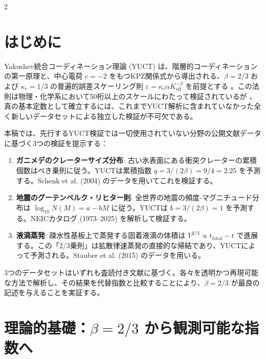 \documentclass[11pt,a4paper]{article}
\newcommand{\eps}{\varepsilon}
\newcommand{\kappac}{\kappa_c}
\newcommand{\Keff}{K_{\mathrm{eff}}}
\newcommand{\betaf}{\beta}
\begin{document}
	\vspace{0.4cm}
	\vspace*{-\baselineskip}
	\begin{multicols}{2}
		
		\section{はじめに}
		
		Yakushev統合コーディネーション理論 (YUCT) は、階層的コーディネーションの第一原理と、中心電荷 \(c = -2\) をもつKPZ関係式から導出される、\(\betaf = 2/3\) および \(\kappac = 1/3\) の普遍的誤差スケーリング則 \(\eps = \kappac \alpha \Keff^{-\betaf}\) を前提とする \cite{AppendixY, AppendixL}。この法則は物理・化学系において50桁以上のスケールにわたって検証されているが \cite{AppendixC, AppendixG}、真の基本定数として確立するには、これまでYUCT解析に含まれていなかった全く新しいデータセットによる独立した検証が不可欠である。
		
		本稿では、先行するYUCT検証では一切使用されていない分野の公開文献データに基づく3つの検証を提示する：
		
		\begin{enumerate}
			\item \textbf{ガニメデのクレーターサイズ分布}: 古い氷表面にある衝突クレーターの累積個数はべき乗則に従う。YUCTは累積指数 \(q = 3/(2\betaf) = 9/4 = 2.25\) を予測する。Schenk et al. (2004) \cite{Schenk2004} のデータを用いてこれを検証する。
			\item \textbf{地震のグーテンベルク・リヒター則}: 全世界の地震の頻度‐マグニチュード分布は \(\log_{10} N(M) = a - bM\) に従う。YUCTは \(b = 3/(2\betaf) = 1\) を予測する。NEICカタログ (1973–2025) \cite{USGSNEIC} を解析して検証する。
			\item \textbf{液滴蒸発}: 疎水性基板上で蒸発する固着液滴の体積は \(V^{2/3} \propto t_{\text{total}} - t\) で進展する。この「2/3乗則」は拡散律速蒸発の直接的な帰結であり、YUCTによって予測される。Stauber et al. (2015) \cite{Stauber2015} のデータを用いる。
		\end{enumerate}
		
		3つのデータセットはいずれも査読付き文献に基づく。各々を透明かつ再現可能な方法で解析し、その結果を代替指数と比較することにより、\(\betaf = 2/3\) が最良の記述を与えることを実証する。
		
		\section{理論的基礎：\(\betaf = 2/3\) から観測可能な指数へ}
		

\end{multicols}
\end{document}
